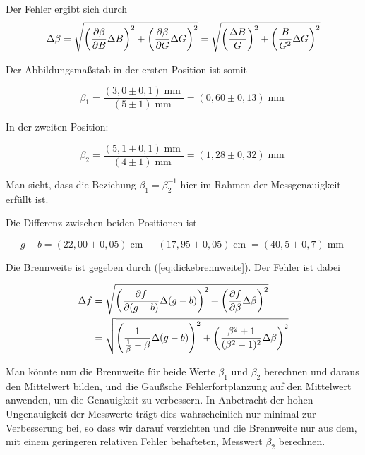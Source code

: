 \documentclass[a4paper,german,12pt,smallheadings]{scrartcl}
\begin{document}
Der Fehler ergibt sich durch
\begin{equation*}
  \Delta \beta
  = \sqrt{
    \del{\frac{\partial \beta}{\partial B} \Delta B}^2 +
    \del{\frac{\partial \beta}{\partial G} \Delta G}^2
  }
  = \sqrt{
    \del{\frac{\Delta B}{G}}^2 +
    \del{\frac{B}{G^2} \Delta G}^2
  }
\end{equation*}

Der Abbildungsmaßstab in der ersten Position ist somit

\begin{equation}
  \beta_1 = \frac{(3{,}0 \pm 0{,}1) \operatorname{mm}}{(5\pm1) \operatorname{mm}} = (0{,}60\pm0{,}13) \operatorname{mm}
\end{equation}

In der zweiten Position:

\begin{equation}
  \beta_2 = \frac{(5{,}1\pm0{,}1) \operatorname{mm}}{(4\pm1) \operatorname{mm}} = (1{,}28\pm 0{,}32) \operatorname{mm}
\end{equation}

Man sieht, dass die Beziehung $\beta_1 = \beta_2^{-1}$ hier im Rahmen der
Messgenauigkeit erfüllt ist.

Die Differenz zwischen beiden Positionen ist

\begin{equation}
  g - b = (22{,}00 \pm 0{,}05) \operatorname{cm}
        - (17{,}95 \pm 0{,}05) \operatorname{cm} = (40{,}5 \pm 0{,}7) \operatorname{mm}
\end{equation}

Die Brennweite ist gegeben durch (\ref{eq:dickebrennweite}). Der Fehler ist
dabei

\begin{align*}
  \Delta f &= \sqrt{
    \del{\frac{\partial f}{\partial (g-b)} \Delta(g-b)}^2 +
    \del{\frac{\partial f}{\partial \beta} \Delta \beta}^2
  } \\
  &= \sqrt{
    \del{\frac{1}{\frac{1}{\beta} - \beta} \Delta(g-b)}^2 +
    \del{\frac{\beta^2 + 1}{(\beta^2 -1)^2} \Delta \beta}^2
  }
\end{align*}

Man könnte nun die Brennweite für beide Werte $\beta_1$ und $\beta_2$ berechnen
und daraus den Mittelwert bilden, und die Gaußsche
Fehlerfortplanzung auf den Mittelwert anwenden, um die Genauigkeit zu
verbessern. In Anbetracht der hohen Ungenauigkeit der Messwerte trägt dies
wahrscheinlich nur minimal zur Verbesserung bei, so dass wir darauf verzichten
und die Brennweite nur aus dem, mit einem geringeren relativen Fehler
behafteten, Messwert $\beta_2$ berechnen.
\end{document}
